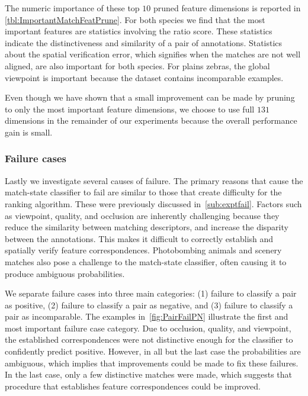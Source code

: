         The numeric importance of these top $10$ pruned feature dimensions is reported in
          \cref{tbl:ImportantMatchFeatPrune}.
        For both species we find that the most important features are statistics involving the ratio score.
        These statistics indicate the distinctiveness and similarity of a pair of annotations.
        Statistics about the spatial verification error, which signifies when the matches are not well aligned,
          are also important for both species.
        For plains zebras, the global viewpoint is important because the dataset contains incomparable examples.

        Even though we have shown that a small improvement can be made by pruning to only the most important
          feature dimensions, we choose to use full $131$ dimensions in the remainder of our experiments because
          the overall performance gain is small.

        \MatchPrune{}

        \ImportantMatchFeatPrune{}

        \FloatBarrier{}

        \subsubsection{Failure cases}

        Lastly we investigate several causes of failure.
        The primary reasons that cause the match-state classifier to fail are similar to those that create
          difficulty for the ranking algorithm.
        These were previously discussed in~\cref{sub:exptfail}.
        Factors such as viewpoint, quality, and occlusion are inherently challenging because they reduce the
          similarity between matching descriptors, and increase the disparity between the annotations.
        This makes it difficult to correctly establish and spatially verify feature correspondences.
        Photobombing animals and scenery matches also pose a challenge to the match-state classifier, often
          causing it to produce ambiguous probabilities.

        We separate failure cases into three main categories:
        (1) failure to classify a pair as positive,
        (2) failure to classify a pair as negative, and
        (3) failure to classify a pair as incomparable.
        The examples in~\cref{fig:PairFailPN} illustrate the first and most important failure case category.
        Due to occlusion, quality, and viewpoint, the established correspondences were not distinctive enough for
          the classifier to confidently predict positive.
        However, in all but the last case the probabilities are ambiguous, which implies that improvements could
          be made to fix these failures.
        In the last case, only a few distinctive matches were made, which suggests that procedure that
          establishes feature correspondences could be improved.


